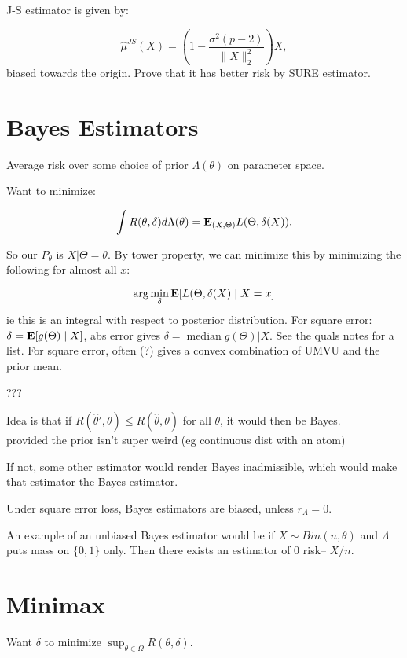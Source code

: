 \documentclass{article}
\begin{document}
J-S estimator is given by:

$$\hat \mu^{JS} (X) = \left ( 1-\frac{\sigma^2(p-2)}{\|X\|_2^2}\right)X,$$
biased towards the origin. Prove that it has better risk by SURE estimator. 

\section{Bayes Estimators}
Average risk over some choice of prior $\Lambda(\theta)$ on parameter space. 

Want to minimize:

$$\int R(\theta, \delta) d\Lambda(\theta) = \mathbf{E}_{(X,\Theta)} L(\Theta, \delta(X)).$$

So our $P_\theta$ is $X|\Theta = \theta$. By tower property, we can minimize this by minimizing the following for almost all $x$:

$$\arg \min_{\delta} \mathbf{E} [L(\Theta, \delta(X) \mid X= x]$$
ie this is an integral with respect to posterior distribution. For square error: $\delta = \mathbf{E}[g(\Theta)\mid X]$, abs error gives $\delta = \operatorname{median} g(\Theta) |X$. See the quals notes for a list. For square error, often (?) gives a convex combination of UMVU and the prior mean. 
\begin{theorem}
???
\end{theorem}
\begin{fact}
Idea is that if $R(\hat \theta ' ,\theta) \leq R(\hat \theta , \theta)$ for all $\theta$, it would then be Bayes. \\ provided the prior isn't super weird (eg continuous dist with an atom) 

\end{fact}

\begin{fact}
If not, some other estimator would render Bayes inadmissible, which would make that estimator the Bayes estimator.
\end{fact}

\begin{fact}
Under square error loss, Bayes estimators are biased, unless $r_\Lambda = 0$.
\end{fact}
An example of an unbiased Bayes estimator would be if $X\sim Bin(n,\theta)$ and $\Lambda$ puts mass on $\{0,1\}$ only. Then there exists an estimator of $0$ risk-- $X/n$. 

\section{Minimax}
Want $\delta$ to minimize $\sup_{\theta \in \Omega} R(\theta, \delta)$. 
\end{document}
